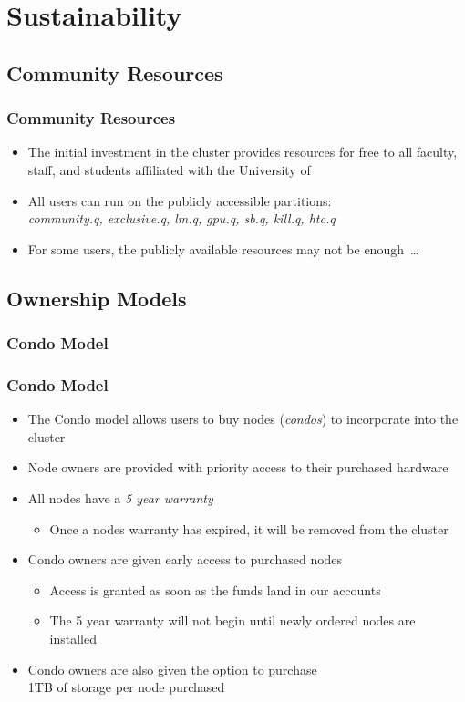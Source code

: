 \section{Sustainability}
\subsection{Community Resources}
\begin{frame}
	\frametitle{Community Resources}
	\begin{itemize}
		\item The initial investment in the cluster provides resources for free to all faculty, staff, and students affiliated with the University of {\hawaii}
		\item All users can run on the publicly accessible partitions:\\ \emph{community.q, exclusive.q, lm.q, gpu.q, sb.q, kill.q, htc.q}
		\item For some users, the publicly available resources may not be enough~\ldots
	\end{itemize}
\end{frame}

\subsection{Ownership Models}

\subsubsection{Condo Model}
\begin{frame}
	\frametitle{Condo Model}
	\begin{itemize}
		\item The Condo model allows users to buy nodes (\emph{condos}) to incorporate into the cluster	
		\item Node owners are provided with priority access to their purchased hardware
		\item All nodes have a \emph{5 year warranty}
		\begin{itemize}
			\item Once a nodes warranty has expired, it will be removed from the cluster
		\end{itemize}
		\item Condo owners are given early access to purchased nodes
		  \begin{itemize}
                    \item Access is granted as soon as the funds land in our accounts
		    \item The 5 year warranty will not begin until newly ordered nodes are installed
		\end{itemize}
		\item Condo owners are also given the option to purchase~\\1TB of {\lustre} storage per node purchased
	\end{itemize}
\end{frame}


